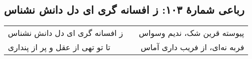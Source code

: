 \begin{center}
\section*{رباعی شمارهٔ ۱۰۳: ز افسانه گری ای دل دانش نشناس}
\label{sec:103}
\begin{longtable}{l p{0.5cm} r}
ز افسانه گری ای دل دانش نشناس
&&
پیوسته قرین شک، ندیم وسواس
\\
تا تو تهی از عقل  و پر از پنداری
&&
فربه نه‌ای، از فریب داری آماس
\\
\end{longtable}
\end{center}
